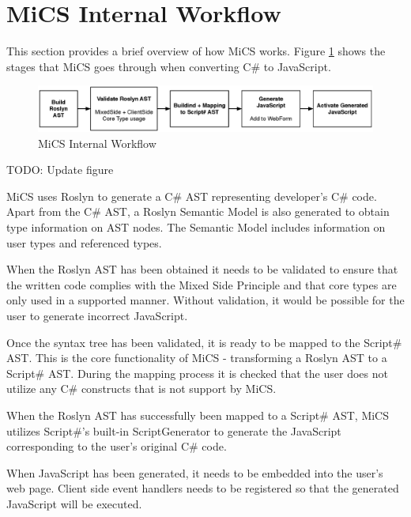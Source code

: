 \section{MiCS Internal Workflow} %
\label{sec:workflow_overview}

This section provides a brief overview of how MiCS works. Figure \ref{fig:mics_internal_workflow} shows the stages that MiCS goes through when converting C\# to JavaScript.

\begin{figure}[H]
	\begin{center}
		\centerline{\includegraphics[width=18cm]{resources/images/internalworkflow.eps}}
	\end{center}
	\caption{MiCS Internal Workflow}
	\label{fig:mics_internal_workflow}
\end{figure}

TODO: Update figure

MiCS uses Roslyn to generate a C\# AST representing developer's  C\# code. Apart from the C\# AST, a Roslyn Semantic Model is also generated to obtain type information on AST nodes. The Semantic Model includes information on user types and referenced types.

When the Roslyn AST has been obtained it needs to be validated to ensure that the written code complies with the Mixed Side Principle and that core types are only used in a supported manner. Without validation, it would be possible for the user to generate incorrect JavaScript.

Once the syntax tree has been validated, it is ready to be mapped to the Script\# AST. This is the core functionality of MiCS - transforming a Roslyn AST to a Script\# AST. During the mapping process it is checked that the user does not utilize any C\# constructs that is not support by MiCS. 

When the Roslyn AST has successfully been mapped to a Script\# AST, MiCS utilizes Script\#’s built-in ScriptGenerator to generate the JavaScript corresponding to the user’s original C\# code. 

When JavaScript has been generated, it needs to be embedded into the user’s web page. Client side event handlers needs to be registered so that the generated JavaScript will be executed.


